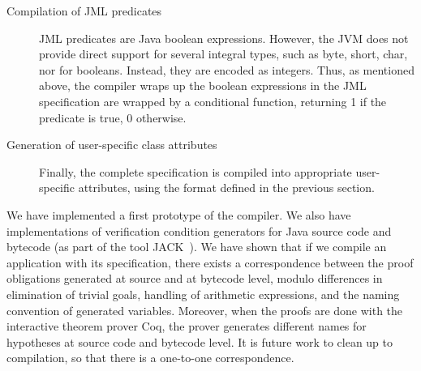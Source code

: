 \begin{description}
\item[Compilation of JML predicates]
JML predicates are Java boolean expressions. However, the JVM does not
provide direct support for several integral types, such as byte,
short, char, nor for booleans. Instead, they are encoded as integers.
Thus, as mentioned above, the compiler wraps up the boolean
expressions in the JML specification are wrapped by a conditional
function, returning 1 if the predicate is true, 0 otherwise.

\item[Generation of user-specific class attributes]
Finally, the complete specification is compiled into appropriate
user-specific attributes, using the format defined in the previous
section. 
    
\end{description}

We have implemented a first prototype of the \JMLtoBML compiler. We
also have implementations of verification condition generators for
Java source code and bytecode (as part of the tool
JACK~\cite{BurdyRL03}). We have shown that if we compile an
application with its specification, there exists a correspondence
between the proof obligations generated at source and at bytecode
level, modulo differences in elimination of trivial goals, handling of
arithmetic expressions, and the naming convention of generated
variables. Moreover, when the proofs are done with the interactive
theorem prover Coq, the prover generates different names for
hypotheses at source code and bytecode level. It is future work to
clean up to compilation, so that there is a one-to-one correspondence.


